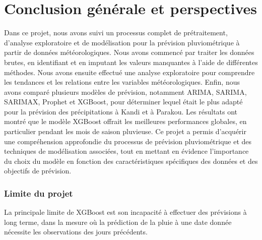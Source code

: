\documentclass[a4paper,12pt]{report}
\theoremstyle{definition}
\begin{document}
	
	
	\section{Conclusion générale et perspectives}
	Dans ce projet, nous avons suivi un processus complet de prétraitement, d'analyse exploratoire et de modélisation pour la prévision pluviométrique à partir de données météorologiques. Nous avons commencé par traiter les données brutes, en identifiant et en imputant les valeurs manquantes à l'aide de différentes méthodes. Nous avons ensuite effectué une analyse exploratoire pour comprendre les tendances et les relations entre les variables météorologiques. Enfin, nous avons comparé plusieurs modèles de prévision, notamment ARIMA, SARIMA, SARIMAX, Prophet et XGBoost, pour déterminer lequel était le plus adapté pour la prévision des précipitations à Kandi et à Parakou. Les résultats ont montré que le modèle XGBoost offrait les meilleures performances globales, en particulier pendant les mois de saison pluvieuse. Ce projet a permis d'acquérir une compréhension approfondie du processus de prévision pluviométrique et des techniques de modélisation associées, tout en mettant en évidence l'importance du choix du modèle en fonction des caractéristiques spécifiques des données et des objectifs de prévision. 
	
	\subsubsection{Limite du projet}
	La principale limite de XGBoost est son incapacité à effectuer des prévisions à long terme, dans la mesure où la prédiction de la pluie à une date donnée nécessite les observations des jours précédents. 
	
\end{document}
